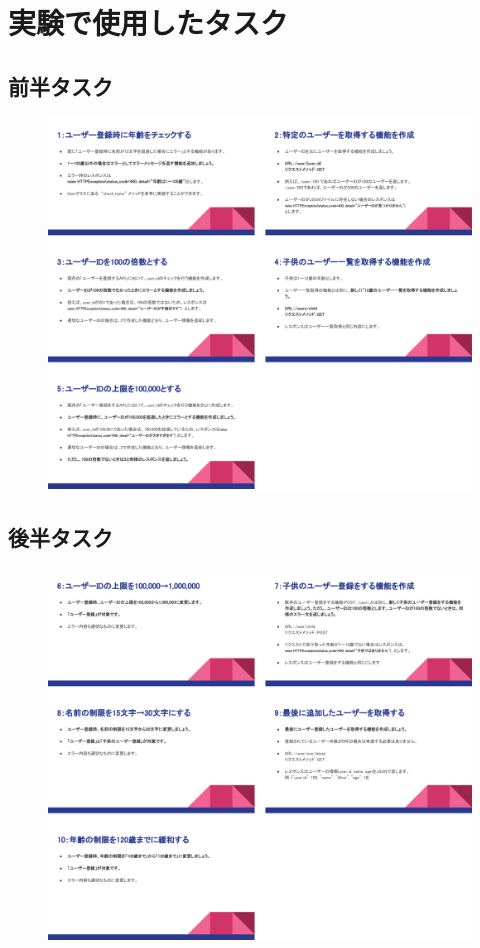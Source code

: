 \appendix
\chapter{実験で使用したタスク}
\label{tasks}

\section{前半タスク}
\begin{figure}[H]
    \centering
    \includegraphics[width=14cm]{images/taska.png}
\end{figure}

\section{後半タスク}
\begin{figure}[H]
    \centering
    \includegraphics[width=14cm]{images/taskb.png}
\end{figure}

